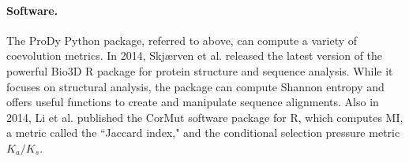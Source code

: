 \paragraph{Software.} The ProDy Python package, referred to above, can compute a variety of coevolution metrics.\cite{Liu2010,Liu2012,Mao2015} In 2014, Skj\ae rven et al.\cite{Skjaerven2014} released the latest version of the powerful Bio3D R package for protein structure and sequence analysis.\cite{Grant2006a} While it focuses on structural analysis, the package can compute Shannon entropy and offers useful functions to create and manipulate sequence alignments. Also in 2014, Li et al.\cite{Li2014d} published the CorMut software package for R, which computes MI, a metric called the ``Jaccard index,"\cite{Rhee2007a} and the conditional selection pressure metric $K_a/K_s$.\cite{Hurst2002a}
\clearpage
